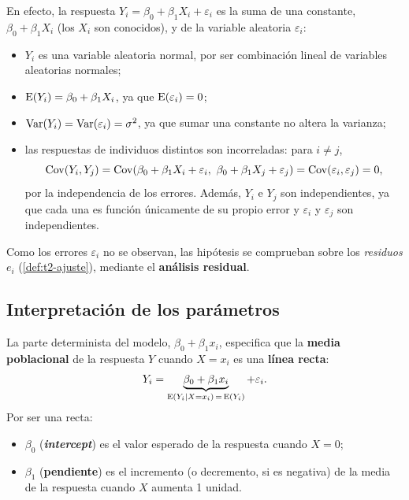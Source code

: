 En efecto, la respuesta $Y_i=\beta_0+\beta_1X_i+\varepsilon_i$ es la suma de una constante,
$\beta_0+\beta_1X_i$ (los $X_i$ son conocidos), y de la variable aleatoria $\varepsilon_i$:
\begin{itemize}
  \item $Y_i$ es una variable aleatoria normal, por ser combinación lineal de variables
    aleatorias normales;
  \item $\operatorname{E}(Y_i)=\beta_0+\beta_1X_i$, ya que $\operatorname{E}(\varepsilon_i)=0$;
  \item $\operatorname{Var}(Y_i)=\operatorname{Var}(\varepsilon_i)=\sigma^2$, ya que sumar una constante no altera la
    varianza;
  \item las respuestas de individuos distintos son incorreladas: para $i\neq j$,
    \[
      \Cov(Y_i,Y_j)=\Cov(\beta_0+\beta_1X_i+\varepsilon_i,\ \beta_0+\beta_1X_j+\varepsilon_j)
      =\Cov(\varepsilon_i,\varepsilon_j)=0,
    \]
    por la independencia de los errores. Además, $Y_i$ e $Y_j$ son independientes, ya que cada
    una es función únicamente de su propio error y $\varepsilon_i$ y $\varepsilon_j$ son
    independientes.
\end{itemize}

\begin{nota}
  Como los errores $\varepsilon_i$ no se observan, las hipótesis se comprueban sobre los
  \emph{residuos} $e_i$ (\cref{def:t2-ajuste}), mediante el \textbf{análisis residual}.
\end{nota}

\subsection{Interpretación de los parámetros}

La parte determinista del modelo, $\beta_0+\beta_1x_i$, especifica que la \textbf{media
poblacional} de la respuesta $Y$ cuando $X=x_i$ es una \textbf{línea recta}:
\[
  Y_i = \underbrace{\beta_0+\beta_1x_i}_{\operatorname{E}(Y_i\mid X=x_i)\,=\,\operatorname{E}(Y_i)} + \varepsilon_i .
\]
Por ser una recta:
\begin{itemize}
  \item $\beta_0$ (\textbf{\emph{intercept}}) es el valor esperado de la respuesta cuando $X=0$;
  \item $\beta_1$ (\textbf{pendiente}) es el incremento (o decremento, si es negativa) de la
    media de la respuesta cuando $X$ aumenta 1 unidad.
\end{itemize}

